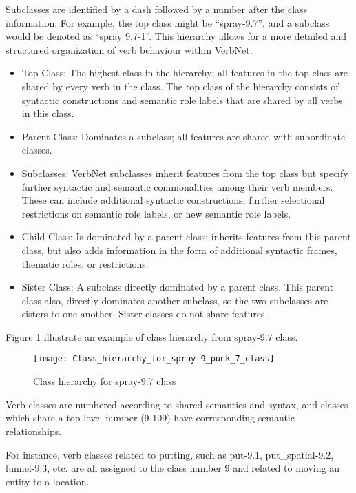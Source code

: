 Subclasses are identified by a dash followed by a number after the class information. For example, the top class might be \enquote{spray-9.7}, and a subclass would be denoted as \enquote{spray 9.7-1}. This hierarchy allows for a more detailed and structured organization of verb behaviour within VerbNet. 
\begin{itemize}

\item Top Class: The highest class in the hierarchy; all features in the top class are shared by every verb in the class. The top class of the hierarchy consists of syntactic constructions and semantic role labels that are shared by all verbs in this class.

\item Parent Class: Dominates a subclass; all features are shared with subordinate classes.

\item Subclasses: VerbNet subclasses inherit features from the top class but specify further syntactic and semantic commonalities among their verb members. These can include additional syntactic constructions, further selectional restrictions on semantic role labels, or new semantic role labels.

\item Child Class: Is dominated by a parent class; inherits features from this parent class, but also adds information in the form of additional syntactic frames, thematic roles, or restrictions. 

\item Sister Class: A subclass directly dominated by a parent class. This parent class also, directly dominates another subclass, so the two subclasses are sisters to one another. Sister classes do not share features.

\end{itemize}
Figure \ref{fig:hierachy_class} illustrate an example of class hierarchy from spray-9.7 class.
\begin{figure}[h]
\centering
\texttt{[image: Class\_hierarchy\_for\_spray-9\_punk\_7\_class]}
\caption{Class hierarchy for spray-9.7 class \cite{heck2014quality}}\label{fig:hierachy_class}
\end{figure}
Verb classes are numbered according to shared semantics and syntax, and classes which share a top-level number (9-109) have corresponding semantic relationships. 

For instance, verb classes related to putting, such as put-9.1, put\_spatial-9.2, funnel-9.3, etc. are all assigned to the class number 9 and related to moving an entity to a location. 

